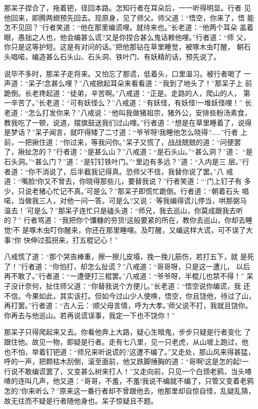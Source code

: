 那呆子捏合了，拖着钯，径回本路。怎知行者在耳朵后，一一听得明显。行者
见他回来，即腾两翅预先回去。现原身，见了师父。师父道：“悟空，你来了，悟
能怎不见回？”行者笑道：“他在那里编谎哩。就待来也。”长老道：“他两个耳朵
盖着眼，愚拙之人也，他会编甚么谎?又是你捏合甚么鬼话赖他哩。”行者道：“师
父，你只是这等护短。这是有对问的话。”把他那钻在草里睡觉，被啄木虫叮醒，
朝石头唱喏，编造甚么石头山、石头洞、铁叶门、有妖精的话，预先说了。

说毕不多时，那呆子走将来。又怕忘了那谎，低着头，口里温习。被行者喝了
一声道：“呆子!念甚么哩？”八戒掀起耳朵来看看道：“我到了地头了！”那呆子上
前跪倒。长老搀起道：“徒弟，辛苦啊。”八戒道：“正是。走路的人，爬山的人，
第一辛苦了。”长老道：“可有妖怪么？”八戒道：“有妖怪，有妖怪!一堆妖怪哩！”
长老道：“怎么打发你来？”八戒说：“他叫我做猪祖宗，猪外公，安排些粉汤素食，
教我吃了一顿，说道，摆旗鼓送我们过山哩。”行者道：“想是在草里睡着了，说得
是梦话？”呆子闻言，就吓得矮了二寸道：“爷爷呀!我睡他怎么晓得?……”行者
上前，一把揪住道：“你过来，等我问你。”呆子又慌了，战战兢兢的道：“问便罢
了，揪扯怎的？”行者道：“是甚么山？”八戒道：“是石头山。”“甚么洞？”道：
“是石头洞。”“甚么门？”道：“是钉钉铁叶门。”“里边有多远？”道：“入内是三
层。”行者道：“你不消说了，后半截我记得真。恐师父不信，我替你说了罢。”八
戒道：“嘴脸!你又不曾去，你晓得那些儿，要替我说？”行者笑道：“‘门上钉子有
多少，只说老猪心忙记不真。’可是么？”那呆子即慌忙跪倒。行者道：“朝着石头
唱喏，当做我三人，对他一问一答。可是么?又说：‘等我编得谎儿停当，哄那弼马
温去！’可是么？”那呆子连忙只是磕头道：“师兄，我去巡山，你莫成跟我去听的？”
行者骂道：“我把你个馕糠的夯货!这般要紧的所在，教你去巡山，你却去睡觉!不
是啄木虫叮你醒来，你还在那里睡哩。及叮醒，又编这样大谎，可不误了大事?你
快伸过孤拐来，打五棍记心！”

八戒慌了道：“那个哭丧棒重，擦一擦儿皮塌，挽一挽儿筋伤，若打五下，就
是死了！”行者道：“你怕打，却怎么扯谎？”八戒道：“哥哥呀，只是这一遭儿，
以后再不敢了。”行者道：“一遭便打三棍罢。”八戒道：“爷爷呀，半棍儿也禁不得！”
呆子没计奈何，扯住师父道：“你替我说个方便儿。”长老道：“悟空说你编谎，我
还不信。今果如此，其实该打。但如今过山少人使唤，悟空，你且饶他，待过了山，
再打罢。”行者道：“古人云：‘顺父母言情，呼为大孝。’师父说不打，我就且饶你。
你再去与他巡山。若再说谎误事，我定一下也不饶你！”

那呆子只得爬起来又去。你看他奔上大路，疑心生暗鬼，步步只疑是行者变化
了跟住他。故见一物，即疑是行者。走有七八里，见一只老虎，从山坡上跑过，他
也不怕，举着钉钯道：“师兄来听说谎的?这遭不编了。”又走处，那山风来得甚猛，
呼的一声，把颗枯木刮倒，滚至面前，他又跌脚捶胸的道：“哥啊!这是怎的起!一
行说不敢编谎罢了，又变甚么树来打人！”又走向前，只见一个白颈老鸦，当头喳
喳的连叫几声，他又道：“哥哥，不羞，不羞!我说不编就不编了，只管又变着老鸦
怎的?你来听么？”原来这一番行者却不曾跟他去，他那里却自惊自怪，乱疑乱猜，
故无往而不疑是行者随他身也。呆子惊疑且不题。

